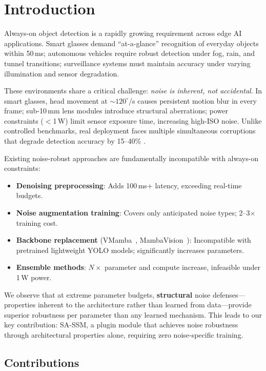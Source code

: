 \documentclass[conference]{IEEEtran}
\begin{document}
\section{Introduction}

Always-on object detection is a rapidly growing requirement across edge AI applications. Smart glasses demand ``at-a-glance'' recognition of everyday objects within 50\,ms; autonomous vehicles require robust detection under fog, rain, and tunnel transitions; surveillance systems must maintain accuracy under varying illumination and sensor degradation.

These environments share a critical challenge: \emph{noise is inherent, not accidental}. In smart glasses, head movement at ${\sim}120^\circ$/s causes persistent motion blur in every frame; sub-10\,mm lens modules introduce structural aberrations; power constraints ($<$1\,W) limit sensor exposure time, increasing high-ISO noise. Unlike controlled benchmarks, real deployment faces multiple simultaneous corruptions that degrade detection accuracy by 15--40\% \cite{hendrycks2019benchmarking}.

Existing noise-robust approaches are fundamentally incompatible with always-on constraints:
\begin{itemize}
\item \textbf{Denoising preprocessing}: Adds 100\,ms+ latency, exceeding real-time budgets.
\item \textbf{Noise augmentation training}: Covers only anticipated noise types; 2--3$\times$ training cost.
\item \textbf{Backbone replacement} (VMamba~\cite{liu2024vmamba}, MambaVision~\cite{hatamizadeh2024mambavision}): Incompatible with pretrained lightweight YOLO models; significantly increases parameters.
\item \textbf{Ensemble methods}: $N\times$ parameter and compute increase, infeasible under 1\,W power.
\end{itemize}

We observe that at extreme parameter budgets, \textbf{structural} noise defenses---properties inherent to the architecture rather than learned from data---provide superior robustness per parameter than any learned mechanism. This leads to our key contribution: SA-SSM, a plugin module that achieves noise robustness through architectural properties alone, requiring zero noise-specific training.

\subsection{Contributions}
\end{document}

